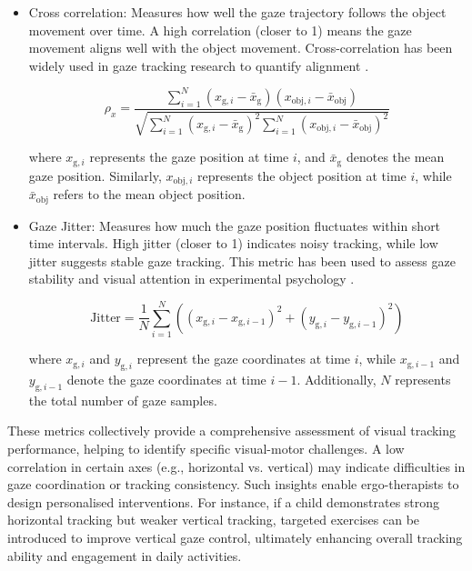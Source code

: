 \documentclass[10pt,a4paper,twoside]{article}
\begin{document}
\begin{itemize}
    \item Cross correlation: Measures how well the gaze trajectory follows the object movement over time. A high correlation (closer to 1) means the gaze movement aligns well with the object movement. Cross-correlation has been widely used in gaze tracking research to quantify alignment \cite{Duchowski2007}.

    \begin{equation}
    \label{cross}
        \rho_{x} =
        \frac{\sum_{i=1}^{N} (x_{\text{g}, i} - \bar{x}_{\text{g}}) (x_{\text{obj}, i} - \bar{x}_{\text{obj}})}
        {\sqrt{\sum_{i=1}^{N} (x_{\text{g}, i} - \bar{x}_{\text{g}})^2 \sum_{i=1}^{N} (x_{\text{obj}, i} - \bar{x}_{\text{obj}})^2}}
    \end{equation}


    where \( x_{\text{g}, i} \) represents the gaze position at time \( i \), and \( \bar{x}_{\text{g}} \) denotes the mean gaze position. Similarly, \( x_{\text{obj}, i} \) represents the object position at time \( i \), while \( \bar{x}_{\text{obj}} \) refers to the mean object position.

    \item Gaze Jitter: Measures how much the gaze position fluctuates within short time intervals. High jitter (closer to 1) indicates noisy tracking, while low jitter suggests stable gaze tracking. This metric has been used to assess gaze stability and visual attention in experimental psychology \cite{Engbert2003}.

    \begin{equation}
    \label{jitter}
        \text{Jitter} =
        \frac{1}{N} \sum_{i=1}^{N}
        \left( (x_{\text{g}, i} - x_{\text{g}, i-1})^2 + (y_{\text{g}, i} - y_{\text{g}, i-1})^2 \right)
    \end{equation}

    where \( x_{\text{g}, i} \) and \( y_{\text{g}, i} \) represent the gaze coordinates at time \( i \), while \( x_{\text{g}, i-1} \) and \( y_{\text{g}, i-1} \) denote the gaze coordinates at time \( i-1 \). Additionally, \( N \) represents the total number of gaze samples.
\end{itemize}

These metrics collectively provide a comprehensive assessment of visual tracking performance, helping to identify specific visual-motor challenges. A low correlation in certain axes (e.g., horizontal vs. vertical) may indicate difficulties in gaze coordination or tracking consistency. Such insights enable ergo-therapists to design personalised interventions. For instance, if a child demonstrates strong horizontal tracking but weaker vertical tracking, targeted exercises can be introduced to improve vertical gaze control, ultimately enhancing overall tracking ability and engagement in daily activities.
\end{document}
